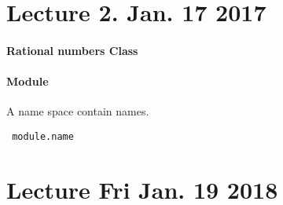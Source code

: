 \documentclass{article}
\begin{document}
	\section{Lecture 2. Jan. 17 2017}
	\paragraph{Rational numbers Class}
	\paragraph{Module} A name space contain names. \begin{verbatim} module.name \end{verbatim} 
	

	\section{Lecture Fri Jan. 19 2018}
	\paragraph{}
\end{document}
